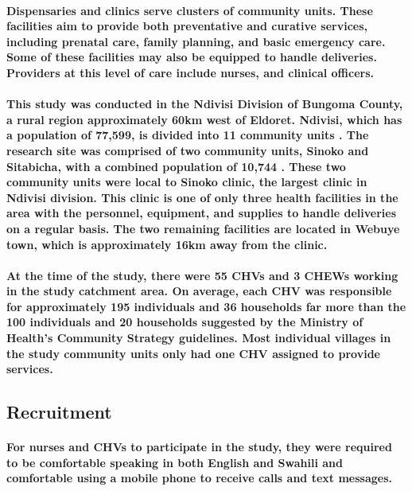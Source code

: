 \paragraph{Dispensaries and clinics serve clusters of community units. These facilities aim to provide both preventative and curative services, including prenatal care, family planning, and basic emergency care. Some of these facilities may also be equipped to handle deliveries. Providers at this level of care include nurses, and clinical officers.}

\paragraph{This study was conducted in the Ndivisi Division of Bungoma County, a rural region approximately 60km west of Eldoret. Ndivisi, which has a population of 77,599, is divided into 11 community units \citep{Census2009}. The research site was comprised of two community units, Sinoko and Sitabicha, with a combined population of 10,744 \citep{Census2009}. These two community units were local to Sinoko clinic, the largest clinic in Ndivisi division. This clinic is one of only three health facilities in the area with the personnel, equipment, and supplies to handle deliveries on a regular basis. The two remaining facilities are located in Webuye town, which is approximately 16km away from the clinic.}

\paragraph{At the time of the study, there were 55 CHVs and 3 CHEWs working in the study catchment area. On average, each CHV was responsible for approximately 195 individuals and 36 households \textemdash  far more than the 100 individuals and 20 households suggested by the Ministry of Health's Community Strategy guidelines. Most individual villages in the study community units only had one CHV assigned to provide services.}


\subsection{Recruitment}
\paragraph{For nurses and CHVs to participate in the study, they were required to be comfortable speaking in both English and Swahili and comfortable using a mobile phone to receive calls and text messages.}

